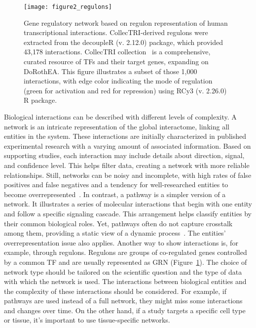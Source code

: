 \begin{figure}[htbp]
    \centering
    \texttt{[image: figure2\_regulons]}
    \caption{Gene regulatory network based on regulon representation of human transcriptional interactions. CollecTRI-derived regulons were extracted from the decoupleR (v. 2.12.0) package, which provided 43,178 interactions. CollecTRI collection~\cite{RN145} is a comprehensive, curated resource of \gls{TF}s and their target genes, expanding on DoRothEA. This figure illustrates a subset of those 1,000 interactions, with edge color indicating the mode of regulation (green for activation and red for repression) using RCy3 (v. 2.26.0) R package.}
    \label{fig:figure2}
\end{figure}


Biological interactions can be described with different levels of complexity. A network is an intricate representation of the global interactome, linking all entities in the system. These interactions are initially characterized in published experimental research with a varying amount of associated information. Based on supporting studies, each interaction may include details about direction, signal, and confidence level. This helps filter data, creating a network with more reliable relationships. 
Still, networks can be noisy and incomplete, with high rates of false positives and false negatives and a tendency for well-researched entities to become overrepresented~\cite{RN131, RN38, RN136}. In contrast, a pathway is a simpler version of a network. It illustrates a series of molecular interactions that begin with one entity and follow a specific signaling cascade. This arrangement helps classify entities by their common biological roles. 
Yet, pathways often do not capture crosstalk among them, providing a static view of a dynamic process~\cite{RN38}. The entities' overrepresentation issue also applies. Another way to show interactions is, for example, through regulons. 
Regulons are groups of co-regulated genes controlled by a common \gls{TF} and are usually represented as \gls{GRN} (Figure~\ref{fig:figure2}). The choice of network type should be tailored on the scientific question and the type of data with which the network is used. The interactions between biological entities and the complexity of these interactions should be considered. For example, if pathways are used instead of a full network, they might miss some interactions and changes over time. On the other hand, if a study targets a specific cell type or tissue, it's important to use tissue-specific networks.

